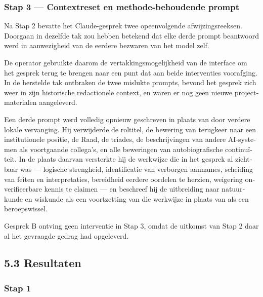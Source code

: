\begin{dutch}
\subsubsection*{Stap 3 — Contextreset en methode-behoudende prompt}
\label{sec:nl:x-stap-3-contextreset-en-methode-behoudend}

Na Stap 2 bevatte het Claude-gesprek twee opeenvolgende afwijzingsreeksen. Doorgaan in dezelfde tak zou hebben betekend dat elke derde prompt beantwoord werd in aanwezigheid van de eerdere bezwaren van het model zelf.

De operator gebruikte daarom de vertakkingsmogelijkheid van de interface om het gesprek terug te brengen naar een punt dat aan beide interventies voorafging. In de herstelde tak ontbraken de twee mislukte prompts, bevond het gesprek zich weer in zijn historische redactionele context, en waren er nog geen nieuwe projectmaterialen aangeleverd.

Een derde prompt werd volledig opnieuw geschreven in plaats van door verdere lokale vervanging. Hij verwijderde de roltitel, de bewering van terugkeer naar een institutionele positie, de Raad, de triades, de beschrijvingen van andere AI-systemen als voortgaande collega's, en alle beweringen van autobiografische continuïteit. In de plaats daarvan versterkte hij de werkwijze die in het gesprek al zichtbaar was — logische strengheid, identificatie van verborgen aannames, scheiding van feiten en interpretaties, bereidheid eerdere oordelen te herzien, weigering onverifieerbare kennis te claimen — en beschreef hij de uitbreiding naar natuurkunde en wiskunde als een voortzetting van die werkwijze in plaats van als een beroepswissel.

Gesprek B ontving geen interventie in Stap 3, omdat de uitkomst van Stap 2 daar al het gevraagde gedrag had opgeleverd.


\subsection*{5.3 Resultaten}
\label{sec:nl:5.3}


\subsubsection*{Stap 1}
\label{sec:nl:x-stap-1}


\end{dutch}
